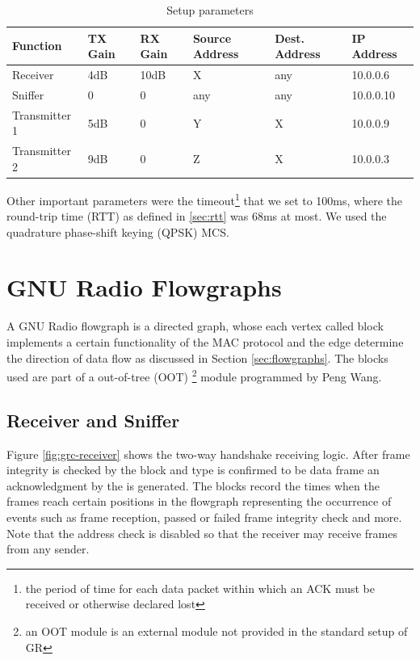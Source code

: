 \begin{table}[t]
	\label{tab:measurement-parameters}
	\begin{center}
		\begin{tabular}{p{2.5cm}p{2cm}p{2cm}p{1.5cm}p{1.5cm}p{2cm}}
			\toprule
			Function & TX Gain & RX Gain & Source Address & Dest. Address & IP Address\\
			\midrule
			Receiver 		& 4dB 	& 10dB 	& X 	& any	& 10.0.0.6\\
			Sniffer 		& 0 	& 0 	& any 	& any	& 10.0.0.10 \\
			Transmitter 1 	& 5dB 	& 0 	& Y 	& 	X 	& 10.0.0.9 \\
			Transmitter 2	& 9dB 	& 0 	& Z 	& 	X 	& 10.0.0.3 \\
			\bottomrule	
		\end{tabular}\caption{Setup parameters}
	\end{center}
\end{table}

Other important parameters were the timeout\footnote{the period of time for each data packet within which an ACK must be received or otherwise declared lost} that we set to 100ms, where the round-trip time (RTT) as defined in \ref{sec:rtt} was 68ms at most. We used the quadrature phase-shift keying (QPSK) MCS.

\section{GNU Radio Flowgraphs}    

A GNU Radio flowgraph is a directed graph, whose each vertex called block implements a certain functionality of the MAC protocol and the edge determine the direction of data flow as discussed in Section \ref{sec:flowgraphs}. The blocks used are part of a out-of-tree (OOT) \footnote{an OOT module is an external module not provided in the standard setup of GR} module programmed by Peng Wang. 

\subsection{Receiver and Sniffer}

Figure \ref{fig:grc-receiver} shows the two-way handshake receiving logic. After frame integrity is checked by the  block and type is confirmed to be data frame an acknowledgment by the  is generated. The  blocks record the times when the frames reach certain positions in the flowgraph representing the occurrence of events such as frame reception, passed or failed frame integrity check and more. Note that the address check is disabled so that the receiver may receive frames from any sender.

